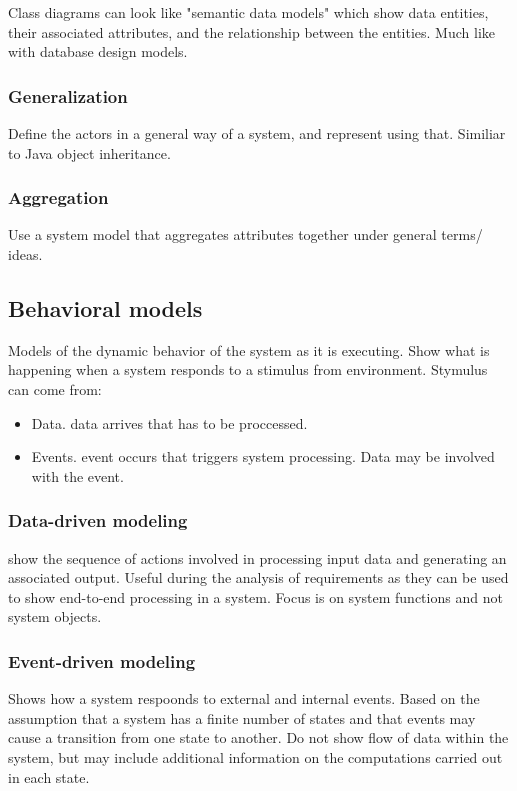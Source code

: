 \documentclass{article}
\begin{document}
Class diagrams can look like "semantic data models" which show data entities, their associated attributes, and the relationship between the entities.
Much like with database design models.

\subsubsection{Generalization}
Define the actors in a general way of a system, and represent using that.  Similiar to Java object inheritance.

\subsubsection{Aggregation}
Use a system model that aggregates attributes together under general terms/ ideas.



\subsection{Behavioral models}

Models of the dynamic behavior of the system as it is executing.  
Show what is happening when a system responds to a stimulus from environment.
Stymulus can come from:
\begin{itemize}
    \item Data.  data arrives that has to be proccessed.
    \item Events. event occurs that triggers system processing.  Data may be involved with the event.
\end{itemize}


\subsubsection{Data-driven modeling}
show the sequence of actions involved in processing input data and generating an associated output.
Useful during the analysis of requirements as they can be used to show end-to-end processing in a system.
Focus is on system functions and not system objects.

\subsubsection{Event-driven modeling}
Shows how a system respoonds to external and internal events.  Based on the assumption that a system has a finite number of states and that events may cause a transition from one state to another.
Do not show flow of data within the system, but may include additional information on the computations carried out in each state.
\end{document}

